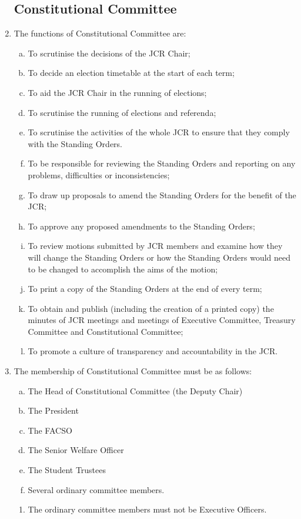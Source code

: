 \documentclass[12pt]{article}
\begin{document}
\begin{enumerate}
    \subsection{Constitutional Committee}
    \item The functions of Constitutional Committee are:
    \begin{enumerate}[(a)]
        \item To scrutinise the decisions of the JCR Chair;
        \item To decide an election timetable at the start of each term;
        \item To aid the JCR Chair in the running of elections;
        \item To scrutinise the running of elections and referenda;
        \item To scrutinise the activities of the whole JCR to ensure that they comply with the Standing Orders.
        \item To be responsible for reviewing the Standing Orders and reporting on any problems, difficulties or inconsistencies;
        \item To draw up proposals to amend the Standing Orders for the benefit of the JCR;
        \item To approve any proposed amendments to the Standing Orders;
        \item To review motions submitted by JCR members and examine how they will change the Standing Orders or how the Standing Orders would need to be changed to accomplish the aims of the motion;
        \item To print a copy of the Standing Orders at the end of every term;
        \item To obtain and publish (including the creation of a printed copy) the minutes of JCR meetings and meetings of Executive Committee, Treasury Committee and Constitutional Committee;
        \item To promote a culture of transparency and accountability in the JCR.
    \end{enumerate}
    \item The membership of Constitutional Committee must be as follows:
    \begin{enumerate}[(a)]
        \item The Head of Constitutional Committee (the Deputy Chair)
        \item The President
        \item The FACSO
        \item The Senior Welfare Officer
        \item The Student Trustees
        \item Several ordinary committee members.
    \end{enumerate}
    \begin{enumerate}
        \item The ordinary committee members must not be Executive Officers.
    \end{enumerate}


\end{enumerate}
\end{document}
